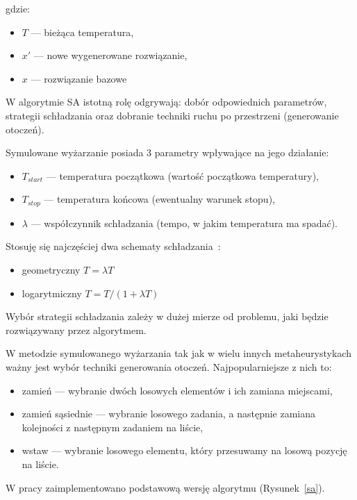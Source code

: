 gdzie:
\begin{itemize}
	\item $T$ --- bieżąca temperatura,
	\item $x'$ --- nowe wygenerowane rozwiązanie,
	\item $x$ --- rozwiązanie bazowe
\end{itemize}

W algorytmie SA istotną rolę odgrywają: dobór odpowiednich parametrów, strategii schładzania oraz dobranie techniki ruchu po przestrzeni (generowanie otoczeń).

\breakparagraph{}
Symulowane wyżarzanie posiada 3 parametry wpływające na jego działanie:
\begin{itemize}
	\item $T_{start}$ --- temperatura początkowa (wartość początkowa temperatury),
	\item $T_{stop}$ --- temperatura końcowa (ewentualny warunek stopu),
	\item $\lambda$ --- współczynnik schładzania (tempo, w jakim temperatura ma spadać).
\end{itemize}

\breakparagraph{}
Stosuję się najczęściej dwa schematy schładzania~\cite{Smutnicki2002As}:
\begin{itemize}
	\item geometryczny $T = \lambda T$
	\item logarytmiczny $T = T /(1 + \lambda T)$
\end{itemize}

\breakparagraph{}
Wybór strategii schładzania zależy w dużej mierze od problemu, jaki będzie rozwiązywany przez algorytmem.

\breakparagraph{}
W metodzie symulowanego wyżarzania tak jak w wielu innych metaheurystykach ważny jest wybór techniki generowania otoczeń. Najpopularniejsze z nich to:
\begin{itemize}
	\item zamień --- wybranie dwóch losowych elementów i ich zamiana miejscami,
	\item zamień sąsiednie --- wybranie losowego zadania, a następnie zamiana kolejności z następnym zadaniem na liście,
	\item wstaw --- wybranie losowego elementu, który przesuwamy na losową pozycję na liście.
\end{itemize}


\breakparagraph{}
W pracy zaimplementowano podstawową wersję algorytmu (Rysunek~\ref{sa}).
\raggedbottom{}


